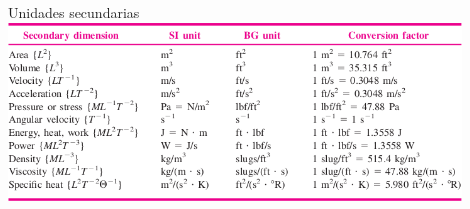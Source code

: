 \documentclass [xcolor=svgnames, t] {beamer}
\begin{document}
\begin{frame}{Unidades secundarias}
\centering
\includegraphics[width=12cm]{secdim}
\end{frame}




%
\end{document}
